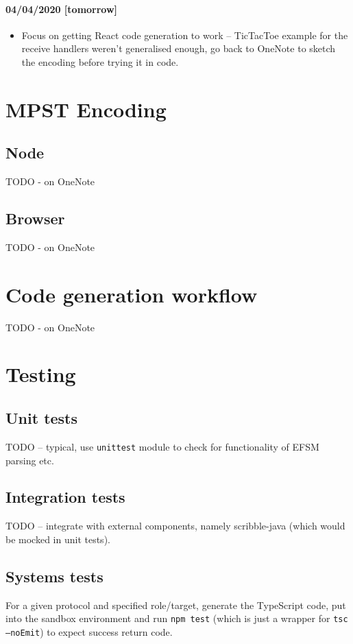 \documentclass{article}
\begin{document}
\paragraph{04/04/2020 [tomorrow]}
\begin{itemize}
\item
Focus on getting React code generation to work -- 
TicTacToe example for the receive handlers weren't
generalised enough, go back to OneNote to sketch
the encoding before trying it in code.
\end{itemize}

\section{MPST Encoding}

\subsection{Node}

TODO - on OneNote

\subsection{Browser}

TODO - on OneNote

\section{Code generation workflow}

TODO - on OneNote

\section{Testing}

\subsection{Unit tests}
TODO -- typical, use \texttt{unittest} module
to check for functionality of EFSM parsing
etc.

\subsection{Integration tests}
TODO -- integrate with external components, namely
scribble-java (which would be mocked in unit tests).

\subsection{Systems tests}
For a given protocol and specified role/target,
generate the TypeScript code, put into the
sandbox environment and run \texttt{npm test} 
(which is just a wrapper for 
\texttt{tsc --noEmit})
to expect success return code.
\end{document}
